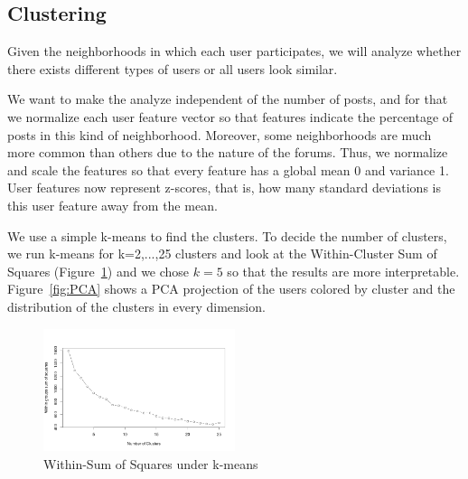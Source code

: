 \documentclass[smallextended]{svjour3}          %
\begin{document}
\subsection{Clustering}

Given the neighborhoods in which each user participates, we will analyze whether there exists different types of users or all users look similar.

We want to make the analyze independent of the number of posts, and for that we normalize each user feature vector so that features indicate the percentage of posts in this kind of neighborhood. Moreover, some neighborhoods are much more common than others due to the nature of the forums. Thus, we normalize and scale the features so that every feature has a global mean 0 and variance 1. User features now represent z-scores, that is, how many standard deviations is this user feature away from the mean.

We use a simple k-means to find the clusters. To decide the number of clusters, we run k-means for k=2,...,25 clusters and look at the Within-Cluster Sum of Squares (Figure~\ref{fig:elbow}) and we chose $k=5$ so that the results are more interpretable.  Figure~\ref{fig:PCA} shows a PCA projection of the users colored by cluster and the distribution of the clusters in every dimension.
\begin{figure}
	\centering
	\includegraphics[width=0.5\textwidth]{elbow}
	\caption{Within-Sum of Squares under k-means}
	\label{fig:elbow}
\end{figure}
\end{document}
